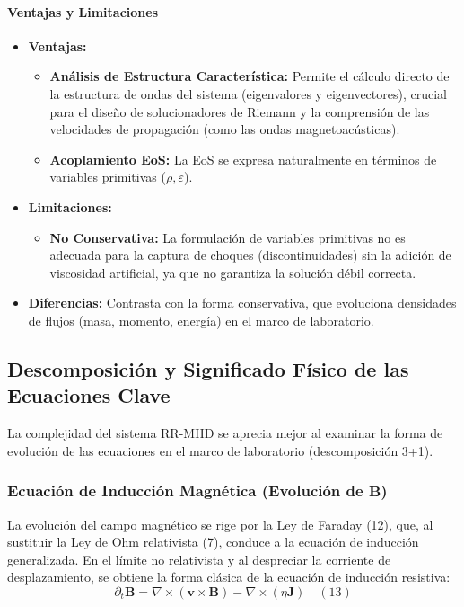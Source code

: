 \paragraph{Ventajas y Limitaciones}
\begin{itemize}
    \item \textbf{Ventajas:}
    \begin{itemize}
        \item \textbf{Análisis de Estructura Característica:} Permite el cálculo directo de la estructura de ondas del sistema (eigenvalores y eigenvectores), crucial para el diseño de solucionadores de Riemann y la comprensión de las velocidades de propagación (como las ondas magnetoacústicas).
        \item \textbf{Acoplamiento EoS:} La EoS se expresa naturalmente en términos de variables primitivas ($\rho, \varepsilon$).
    \end{itemize}
    \item \textbf{Limitaciones:}
    \begin{itemize}
        \item \textbf{No Conservativa:} La formulación de variables primitivas no es adecuada para la captura de choques (discontinuidades) sin la adición de viscosidad artificial, ya que no garantiza la solución débil correcta.
    \end{itemize}
    \item \textbf{Diferencias:} Contrasta con la forma conservativa, que evoluciona densidades de flujos (masa, momento, energía) en el marco de laboratorio.
\end{itemize}

\subsection{Descomposición y Significado Físico de las Ecuaciones Clave}

La complejidad del sistema RR-MHD se aprecia mejor al examinar la forma de evolución de las ecuaciones en el marco de laboratorio (descomposición 3+1).

\subsubsection{Ecuación de Inducción Magnética (Evolución de $\mathbf{B}$)}

La evolución del campo magnético se rige por la Ley de Faraday (12), que, al sustituir la Ley de Ohm relativista (7), conduce a la ecuación de inducción generalizada. En el límite no relativista y al despreciar la corriente de desplazamiento, se obtiene la forma clásica de la ecuación de inducción resistiva:
\begin{equation}
\partial_t \mathbf{B} = \nabla \times (\mathbf{v} \times \mathbf{B}) - \nabla \times (\eta \mathbf{J}) \quad (13)
\end{equation}

